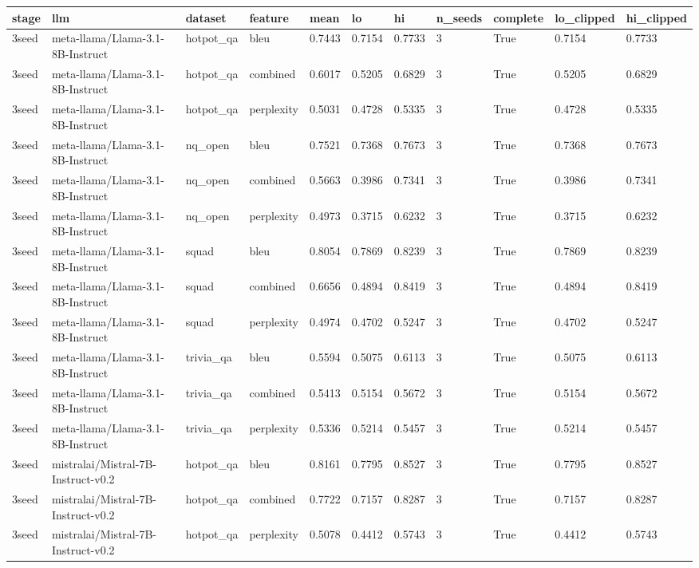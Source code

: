 \begin{tabular}{lllllllllll}
\toprule
stage & llm & dataset & feature & mean & lo & hi & n\_seeds & complete & lo\_clipped & hi\_clipped \\
\midrule
3seed & meta-llama/Llama-3.1-8B-Instruct & hotpot\_qa & bleu & 0.7443 & 0.7154 & 0.7733 & 3 & True & 0.7154 & 0.7733 \\
3seed & meta-llama/Llama-3.1-8B-Instruct & hotpot\_qa & combined & 0.6017 & 0.5205 & 0.6829 & 3 & True & 0.5205 & 0.6829 \\
3seed & meta-llama/Llama-3.1-8B-Instruct & hotpot\_qa & perplexity & 0.5031 & 0.4728 & 0.5335 & 3 & True & 0.4728 & 0.5335 \\
3seed & meta-llama/Llama-3.1-8B-Instruct & nq\_open & bleu & 0.7521 & 0.7368 & 0.7673 & 3 & True & 0.7368 & 0.7673 \\
3seed & meta-llama/Llama-3.1-8B-Instruct & nq\_open & combined & 0.5663 & 0.3986 & 0.7341 & 3 & True & 0.3986 & 0.7341 \\
3seed & meta-llama/Llama-3.1-8B-Instruct & nq\_open & perplexity & 0.4973 & 0.3715 & 0.6232 & 3 & True & 0.3715 & 0.6232 \\
3seed & meta-llama/Llama-3.1-8B-Instruct & squad & bleu & 0.8054 & 0.7869 & 0.8239 & 3 & True & 0.7869 & 0.8239 \\
3seed & meta-llama/Llama-3.1-8B-Instruct & squad & combined & 0.6656 & 0.4894 & 0.8419 & 3 & True & 0.4894 & 0.8419 \\
3seed & meta-llama/Llama-3.1-8B-Instruct & squad & perplexity & 0.4974 & 0.4702 & 0.5247 & 3 & True & 0.4702 & 0.5247 \\
3seed & meta-llama/Llama-3.1-8B-Instruct & trivia\_qa & bleu & 0.5594 & 0.5075 & 0.6113 & 3 & True & 0.5075 & 0.6113 \\
3seed & meta-llama/Llama-3.1-8B-Instruct & trivia\_qa & combined & 0.5413 & 0.5154 & 0.5672 & 3 & True & 0.5154 & 0.5672 \\
3seed & meta-llama/Llama-3.1-8B-Instruct & trivia\_qa & perplexity & 0.5336 & 0.5214 & 0.5457 & 3 & True & 0.5214 & 0.5457 \\
3seed & mistralai/Mistral-7B-Instruct-v0.2 & hotpot\_qa & bleu & 0.8161 & 0.7795 & 0.8527 & 3 & True & 0.7795 & 0.8527 \\
3seed & mistralai/Mistral-7B-Instruct-v0.2 & hotpot\_qa & combined & 0.7722 & 0.7157 & 0.8287 & 3 & True & 0.7157 & 0.8287 \\
3seed & mistralai/Mistral-7B-Instruct-v0.2 & hotpot\_qa & perplexity & 0.5078 & 0.4412 & 0.5743 & 3 & True & 0.4412 & 0.5743 \\

\end{tabular}
